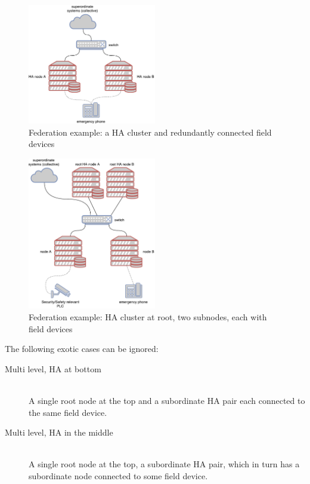 \begin{figure}[]
	\center
	\includegraphics[width=0.5\textwidth]{img/topo_sl_ha.pdf}
	\caption{Federation example: a HA cluster and redundantly connected field devices}
	\label{fig:topo:sl:ha}
\end{figure}
\begin{figure}[]
	\center
	\includegraphics[width=0.5\textwidth]{img/topo_ml_ha.pdf}
	\caption{Federation example: HA cluster at root, two subnodes, each with field devices}
	\label{fig:topo:ml:ha}
\end{figure}

The following exotic cases can be ignored:

\begin{description}
	\item [ Multi level, \gls{HA} at bottom ] \hfill\\
	A single root node at the top and a subordinate HA pair each connected
	to the same field device.

	\item [ Multi level, \gls{HA} in the middle ] \hfill\\
	A single root node at the top, a subordinate HA pair, which in turn has
	a subordinate node connected to some field device.
\end{description}

